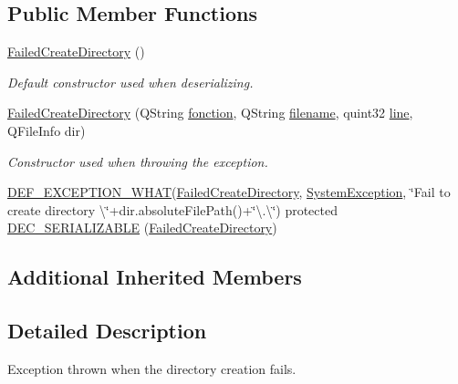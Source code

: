 \subsection*{Public Member Functions}
\begin{DoxyCompactItemize}
\item 
\hyperlink{class_gost_crypt_1_1_failed_create_directory_a400ca831471caed95646ea26bee6f007}{Failed\+Create\+Directory} ()
\begin{DoxyCompactList}\small\item\em Default constructor used when deserializing. \end{DoxyCompactList}\item 
\hyperlink{class_gost_crypt_1_1_failed_create_directory_aeee008589c6af73d9d5604ed1eb8f79a}{Failed\+Create\+Directory} (Q\+String \hyperlink{class_gost_crypt_1_1_gost_crypt_exception_a29b8c93d5efbb1ff369107385725a939}{fonction}, Q\+String \hyperlink{class_gost_crypt_1_1_gost_crypt_exception_a749a12375f4ba9d502623b99d8252f38}{filename}, quint32 \hyperlink{class_gost_crypt_1_1_gost_crypt_exception_abf506d911f12a4e969eea500f90bd32c}{line}, Q\+File\+Info dir)
\begin{DoxyCompactList}\small\item\em Constructor used when throwing the exception. \end{DoxyCompactList}\item 
\hyperlink{_gost_crypt_exception_8h_a5bc1e1c6c9d6f46c84eeba49e33355f9}{D\+E\+F\+\_\+\+E\+X\+C\+E\+P\+T\+I\+O\+N\+\_\+\+W\+H\+AT}(\hyperlink{class_gost_crypt_1_1_failed_create_directory}{Failed\+Create\+Directory}, \hyperlink{class_gost_crypt_1_1_system_exception}{System\+Exception}, \char`\"{}Fail to create directory \textbackslash{}\char`\"{}+dir.\+absolute\+File\+Path()+\char`\"{}\textbackslash{}.\textbackslash{}\char`\"{}) protected \hyperlink{class_gost_crypt_1_1_failed_create_directory_ae729a0778c1cae464a274af79f03a274}{D\+E\+C\+\_\+\+S\+E\+R\+I\+A\+L\+I\+Z\+A\+B\+LE} (\hyperlink{class_gost_crypt_1_1_failed_create_directory}{Failed\+Create\+Directory})
\end{DoxyCompactItemize}
\subsection*{Additional Inherited Members}


\subsection{Detailed Description}
Exception thrown when the directory creation fails. 

